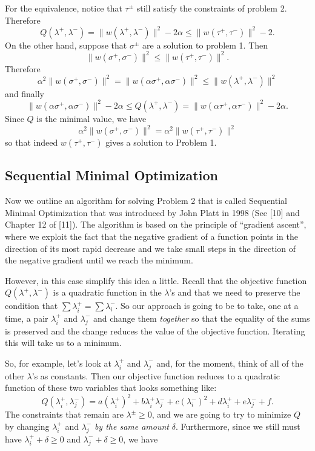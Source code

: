 \documentclass[
  11pt,
  letterpaper,
]{scrbook}
\theoremstyle{plain}
\theoremstyle{remark}
\begin{document}
For the equivalence, notice that \(\tau^{\pm}\) still satisfy the
constraints of problem 2. Therefore \[
Q(\lambda^{+},\lambda^{-}) = \|w(\lambda^{+},\lambda^{-})\|^2-2\alpha\le \|w(\tau^{+},\tau^{-})\|^2-2.
\] On the other hand, suppose that \(\sigma^{\pm}\) are a solution to
problem 1. Then \[
\|w(\sigma^{+},\sigma^{-})\|^2\le \|w(\tau^{+},\tau^{-})\|^2.
\] Therefore \[
\alpha^2 \|w(\sigma^{+},\sigma^{-})\|^2 = \|w(\alpha\sigma^{+},\alpha\sigma^{-})\|^2\le \|w(\lambda^{+},\lambda^{-})\|^2
\] and finally \[
\|w(\alpha\sigma^{+},\alpha\sigma^{-})\|^2-2\alpha\le Q(\lambda^{+},\lambda^{-})=\|w(\alpha\tau^{+},\alpha\tau^{-})\|^2-2\alpha.
\] Since \(Q\) is the minimal value, we have \[
\alpha^{2}\|w(\sigma^{+},\sigma^{-})\|^2 = \alpha^{2}\|w(\tau^{+},\tau^{-})\|^2
\] so that indeed \(w(\tau^{+},\tau^{-})\) gives a solution to Problem
1.

\hypertarget{sequential-minimal-optimization}{%
\subsection{Sequential Minimal
Optimization}\label{sequential-minimal-optimization}}

Now we outline an algorithm for solving Problem 2 that is called
Sequential Minimal Optimization that was introduced by John Platt in
1998 (See {[}10{]} and Chapter 12 of {[}11{]}). The algorithm is based
on the principle of ``gradient ascent'', where we exploit the fact that
the negative gradient of a function points in the direction of its most
rapid decrease and we take small steps in the direction of the negative
gradient until we reach the minimum.

However, in this case simplify this idea a little. Recall that the
objective function \(Q(\lambda^{+},\lambda^{-})\) is a quadratic
function in the \(\lambda\)'s and that we need to preserve the condition
that \(\sum \lambda^{+}_{i}=\sum\lambda^{-}_{i}\). So our approach is
going to be to take, one at a time, a pair \(\lambda^{+}_{i}\) and
\(\lambda^{-}_{j}\) and change them \emph{together} so that the equality
of the sums is preserved and the change reduces the value of the
objective function. Iterating this will take us to a minimum.

So, for example, let's look at \(\lambda^{+}_i\) and \(\lambda^{-}_{j}\)
and, for the moment, think of all of the other \(\lambda\)'s as
constants. Then our objective function reduces to a quadratic function
of these two variables that looks something like: \[
Q(\lambda_{i}^{+},\lambda_{j}^{-}) = a(\lambda^{+}_i)^2+b\lambda^{+}_i\lambda^{-}_j+c(\lambda^{-}_{i})^2+d\lambda^{+}_i+e\lambda^{-}_{j}+f.
\] The constraints that remain are \(\lambda^{\pm}\ge 0\), and we are
going to try to minimize \(Q\) by changing \(\lambda_{i}^{+}\) and
\(\lambda_{j}^{-}\) \emph{by the same amount} \(\delta\). Furthermore,
since we still must have \(\lambda_{i}^{+}+\delta\ge 0\) and
\(\lambda_{j}^{-}+\delta\ge 0\), we have
\end{document}
